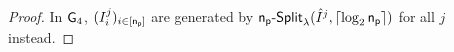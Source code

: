 \begin{proof}
%
%
%

 In $\mathsf{G}_4$, $(I_i^j)_{i\in[\mathsf{n_p}]}$ are generated by $\mathsf{n_p}\text{-}{\mathsf{Split}}_\lambda(\hat{I}^j,\lceil\log_2\mathsf{n_p}\rceil)$ for all $j$ instead.


\end{proof}

